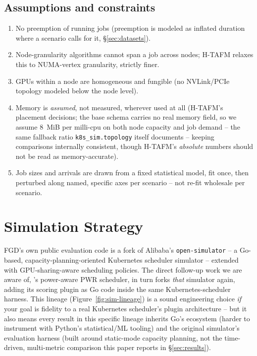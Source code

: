 \documentclass[11pt]{article}
\begin{document}
\subsection{Assumptions and constraints}
\begin{enumerate}[leftmargin=1.4em]
  \item No preemption of running jobs (preemption is modeled as inflated
    duration where a scenario calls for it, \S\ref{sec:datasets}).
  \item Node-granularity algorithms cannot span a job across nodes;
    H-TAFM relaxes this to NUMA-vertex granularity, strictly finer.
  \item GPUs within a node are homogeneous and fungible (no NVLink/PCIe
    topology modeled below the node level).
  \item \label{sec:mem-assumption} Memory is \emph{assumed}, not measured,
    wherever used at all (H-TAFM's placement decisions; the base schema
    carries no real memory field, so we assume $8$~MiB per milli-cpu on
    both node capacity and job demand -- the same fallback ratio
    \texttt{k8s\_sim.topology} itself documents -- keeping comparisons
    internally consistent, though H-TAFM's \emph{absolute} numbers should
    not be read as memory-accurate).
  \item Job sizes and arrivals are drawn from a fixed statistical model,
    fit once, then perturbed along named, specific axes per scenario --
    not re-fit wholesale per scenario.
\end{enumerate}

\section{Simulation Strategy}
\label{sec:sim-strategy}
FGD's own public evaluation code
\citep{kubesimulator} is a fork of Alibaba's \texttt{open-simulator}
\citep{opensimulator} -- a Go-based, capacity-planning-oriented Kubernetes
scheduler simulator -- extended with GPU-sharing-aware scheduling
policies. The direct follow-up work we are aware of, \citet{pwr2024}'s
power-aware PWR scheduler, in turn forks \emph{that} simulator again,
adding its scoring plugin as Go code inside the same Kubernetes-scheduler
harness. This lineage (Figure~\ref{fig:sim-lineage}) is a sound
engineering choice \emph{if} your goal is fidelity to a real Kubernetes
scheduler's plugin architecture -- but it also means every result in this
specific lineage inherits Go's ecosystem (harder to instrument with
Python's statistical/ML tooling) and the original simulator's evaluation
harness (built around static-mode capacity planning, not the
time-driven, multi-metric comparison this paper reports in
\S\ref{sec:results}).
\end{document}
